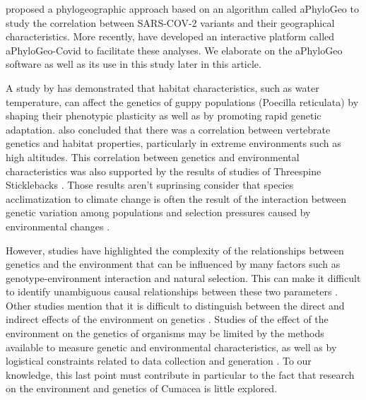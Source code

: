 \cite{koshkarov_phylogeography_2022} proposed a phylogeographic approach based on an algorithm called aPhyloGeo to study the correlation between SARS-COV-2 variants and their geographical characteristics. More recently, \cite{li_aphylogeo-covid_2023} have developed an interactive platform called aPhyloGeo-Covid to facilitate these analyses.  We elaborate on the aPhyloGeo software as well as its use in this study later in this article.

A study by \cite{ghalambor_adaptive_2007} has demonstrated that habitat characteristics, such as water temperature, can affect the genetics of guppy populations (Poecilla reticulata) by shaping their phenotypic plasticity as well as by promoting rapid genetic adaptation. \cite{cheviron_genomic_2012} also concluded that there was a correlation between vertebrate genetics and habitat properties, particularly in extreme environments such as high altitudes. This correlation between genetics and environmental characteristics was also supported by the results of studies of Threespine Sticklebacks \citep{colosimo_widespread_2005, fc_genomic_2012}. Those results aren't suprinsing consider that species acclimatization to climate change is often the result of the interaction between genetic variation among populations and selection pressures caused by environmental changes \citep{hoffmann_climate_2011}.

However, studies have highlighted the complexity of the relationships between genetics and the environment that can be influenced by many factors such as genotype-environment interaction and natural selection. This can make it difficult to identify unambiguous causal relationships between these two parameters \citep{manel_landscape_2003, holderegger_brief_2006, storfer_putting_2007,  balkenhol_identifying_2009, manel_perspectives_2010}. Other studies mention that it is difficult to distinguish between the direct and indirect effects of the environment on genetics \citep{luikart_power_2003, holderegger_brief_2006, balkenhol_identifying_2009, manel_perspectives_2010, balkenhol_landscape_2019}. Studies of the effect of the environment on the genetics of organisms may be limited by the methods available to measure genetic and environmental characteristics, as well as by logistical constraints related to data collection and generation \citep{manel_landscape_2003, storfer_putting_2007, manel_perspectives_2010, shafer_widespread_2013}. To our knowledge, this last point must contribute in particular to the fact that research on the environment and genetics of Cumacea is little explored.

